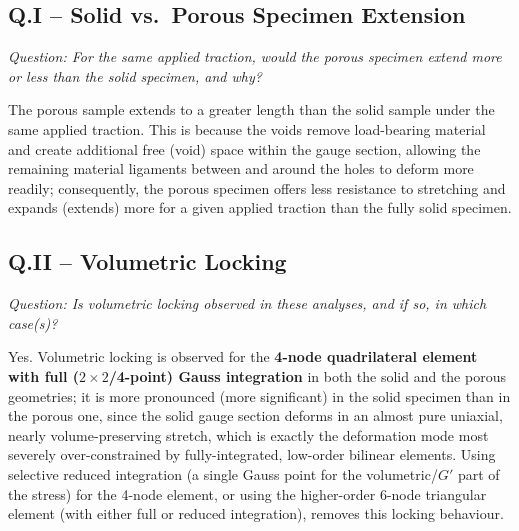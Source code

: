 \documentclass[11pt,a4paper]{article}
\begin{document}
\subsection*{Q.I -- Solid vs.\ Porous Specimen Extension}
\textit{Question: For the same applied traction, would the porous specimen extend more or less than the
solid specimen, and why?}

\noindent The porous sample extends to a greater length than the solid sample under the same applied
traction. This is because the voids remove load-bearing material and create additional free (void) space
within the gauge section, allowing the remaining material ligaments between and around the holes to deform
more readily; consequently, the porous specimen offers less resistance to stretching and expands (extends)
more for a given applied traction than the fully solid specimen.

\subsection*{Q.II -- Volumetric Locking}
\textit{Question: Is volumetric locking observed in these analyses, and if so, in which case(s)?}

\noindent Yes. Volumetric locking is observed for the \textbf{4-node quadrilateral element with full
($2\times2$/4-point) Gauss integration} in both the solid and the porous geometries; it is more pronounced
(more significant) in the solid specimen than in the porous one, since the solid gauge section deforms in
an almost pure uniaxial, nearly volume-preserving stretch, which is exactly the deformation mode most
severely over-constrained by fully-integrated, low-order bilinear elements. Using selective reduced
integration (a single Gauss point for the volumetric/$G'$ part of the stress) for the 4-node element, or
using the higher-order 6-node triangular element (with either full or reduced integration), removes this
locking behaviour.

\end{document}
